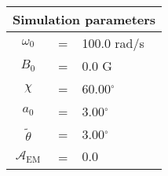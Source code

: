  \begin{tabular}{ccl}
\multicolumn{3}{c}{Simulation parameters} \\
\hline
$\omega_0$  &=& 100.0 rad/s\\
$B_0$  &=& $0.0$ G \\
$\chi$  &=& 60.00$^{\circ}$ \\
$a_0$ &=& 3.00$^{\circ}$ \\
$\tilde{\theta}$ &= & 3.00$^{\circ}$ \\
$\mathcal{A}_{\mathrm{EM}}$ &= & $0.0$
\end{tabular}
    
